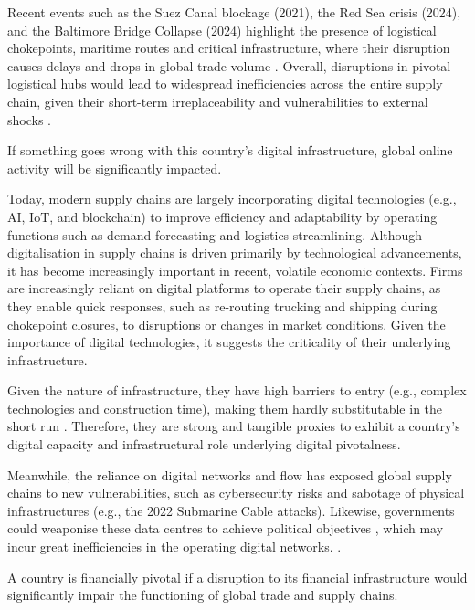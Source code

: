 \documentclass[11pt]{article}
\def\highlight#1#2{
	\begin{centering}
    
		\vspace{1.2ex}
		\begin{minipage}{0.8\linewidth}
			\begin{tcolorbox}[
				boxsep=3.3pt,
				boxrule=0.4pt,
				colback=white,
				colbacktitle=white,
				coltitle=black,
				colframe=black,
				title=\centering \textbf{#1},
			]
				\centering
				#2
			\end{tcolorbox}
		\end{minipage}
		\vspace{1.2ex}
        
	\end{centering}
}
\begin{document}
Recent events such as the Suez Canal blockage (2021), the Red Sea crisis (2024), and the Baltimore Bridge Collapse (2024) highlight the presence of logistical chokepoints, maritime routes and critical infrastructure, where their disruption causes delays and drops in global trade volume \citep{unctad2024}. Overall, disruptions in pivotal logistical hubs would lead to widespread inefficiencies across the entire supply chain, given their short-term irreplaceability and vulnerabilities to external shocks \citep{baldwin2023}.

\highlight{Pivotal Type 5: Digital}{If something goes wrong with this country’s digital infrastructure, global online activity will be significantly impacted.}

Today, modern supply chains are largely incorporating digital technologies (e.g., AI, IoT, and blockchain) to improve efficiency and adaptability by operating functions such as demand forecasting and logistics streamlining. Although digitalisation in supply chains is driven primarily by technological advancements, it has become increasingly important in recent, volatile economic contexts. Firms are increasingly reliant on digital platforms to operate their supply chains, as they enable quick responses, such as re-routing trucking and shipping during chokepoint closures, to disruptions or changes in market conditions. Given the importance of digital technologies, it suggests the criticality of their underlying infrastructure. 
 
Given the nature of infrastructure, they have high barriers to entry (e.g., complex technologies and construction time), making them hardly substitutable in the short run \citep{jurgens2025}. Therefore, they are strong and tangible proxies to exhibit a country’s digital capacity and infrastructural role underlying digital pivotalness. 

Meanwhile, the reliance on digital networks and flow has exposed global supply chains to new vulnerabilities, such as cybersecurity risks and sabotage of physical infrastructures (e.g., the 2022 Submarine Cable attacks). Likewise, governments could weaponise these data centres to achieve political objectives \citep{farrell2019}, which may incur great inefficiencies in the operating digital networks. . 

\highlight{Pivotal Type 6: Financial}{A country is financially pivotal if a disruption to its financial infrastructure would significantly impair the functioning of global trade and supply chains.}
\end{document}
